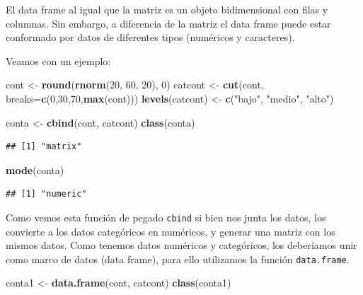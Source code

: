 \documentclass[]{article}
\newenvironment{Shaded}{\begin{snugshade}}{\end{snugshade}}
\newcommand{\KeywordTok}[1]{\textcolor[rgb]{0.13,0.29,0.53}{\textbf{{#1}}}}
\newcommand{\DataTypeTok}[1]{\textcolor[rgb]{0.13,0.29,0.53}{{#1}}}
\newcommand{\DecValTok}[1]{\textcolor[rgb]{0.00,0.00,0.81}{{#1}}}
\newcommand{\StringTok}[1]{\textcolor[rgb]{0.31,0.60,0.02}{{#1}}}
\newcommand{\NormalTok}[1]{{#1}}
\begin{document}
El data frame al igual que la matriz es un objeto bidimensional con
filas y columnas. Sin embargo, a diferencia de la matriz el data frame
puede estar conformado por datos de diferentes tipos (numéricos y
caracteres).

Veamos con un ejemplo:

\begin{Shaded}
\begin{Highlighting}[]
\NormalTok{cont <-}\StringTok{ }\KeywordTok{round}\NormalTok{(}\KeywordTok{rnorm}\NormalTok{(}\DecValTok{20}\NormalTok{, }\DecValTok{60}\NormalTok{, }\DecValTok{20}\NormalTok{), }\DecValTok{0}\NormalTok{)}
\NormalTok{catcont <-}\StringTok{ }\KeywordTok{cut}\NormalTok{(cont, }\DataTypeTok{breaks=}\KeywordTok{c}\NormalTok{(}\DecValTok{0}\NormalTok{,}\DecValTok{30}\NormalTok{,}\DecValTok{70}\NormalTok{,}\KeywordTok{max}\NormalTok{(cont)))}
\KeywordTok{levels}\NormalTok{(catcont) <-}\StringTok{ }\KeywordTok{c}\NormalTok{(}\StringTok{"bajo"}\NormalTok{, }\StringTok{"medio"}\NormalTok{, }\StringTok{"alto"}\NormalTok{) }

\NormalTok{conta <-}\StringTok{ }\KeywordTok{cbind}\NormalTok{(cont, catcont)}
\KeywordTok{class}\NormalTok{(conta)}
\end{Highlighting}
\end{Shaded}

\begin{verbatim}
## [1] "matrix"
\end{verbatim}

\begin{Shaded}
\begin{Highlighting}[]
\KeywordTok{mode}\NormalTok{(conta)}
\end{Highlighting}
\end{Shaded}

\begin{verbatim}
## [1] "numeric"
\end{verbatim}

Como vemos esta función de pegado \texttt{cbind} si bien nos junta los
datos, los convierte a los datos categóricos en numéricos, y generar una
matriz con los mismos datos. Como tenemos datos numéricos y categóricos,
los deberíamos unir como marco de datos (data frame), para ello
utilizamos la función \texttt{data.frame}.

\begin{Shaded}
\begin{Highlighting}[]
\NormalTok{conta1 <-}\StringTok{ }\KeywordTok{data.frame}\NormalTok{(cont, catcont)}
\KeywordTok{class}\NormalTok{(conta1)}
\end{Highlighting}
\end{Shaded}
\end{document}
